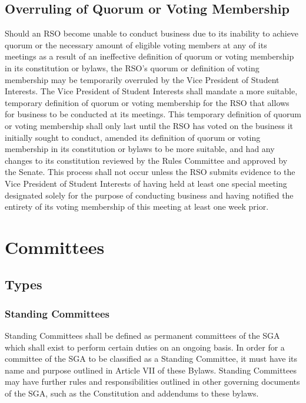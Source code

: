 \documentclass[12pt]{scrreprt}
\begin{document}
\section{Overruling of Quorum or Voting Membership}
Should an RSO become unable to conduct business due to its inability to achieve quorum or the necessary amount of eligible voting members at any of its meetings as a result of an ineffective definition of quorum or voting membership in its constitution or bylaws, the RSO’s quorum or definition of voting membership may be temporarily overruled by the Vice President of Student Interests. The Vice President of Student Interests shall mandate a more suitable, temporary definition of quorum or voting membership for the RSO that allows for business to be conducted at its meetings. This temporary definition of quorum or voting membership shall only last until the RSO has voted on the business it initially sought to conduct, amended its definition of quorum or voting membership in its constitution or bylaws to be more suitable, and had any changes to its constitution reviewed by the Rules Committee and approved by the Senate. This process shall not occur unless the RSO submits evidence to the Vice President of Student Interests of having held at least one special meeting designated solely for the purpose of conducting business and having notified the entirety of its voting membership of this meeting at least one week prior.

\chapter{Committees}

\section{Types}

\subsection{Standing Committees}
Standing Committees shall be defined as permanent committees of the SGA which shall exist to perform certain duties on an ongoing basis. In order for a committee of the SGA to be classified as a Standing Committee, it must have its name and purpose outlined in Article VII of these Bylaws. Standing Committees may have further rules and responsibilities outlined in other governing documents of the SGA, such as the Constitution and addendums to these bylaws.
\end{document}
